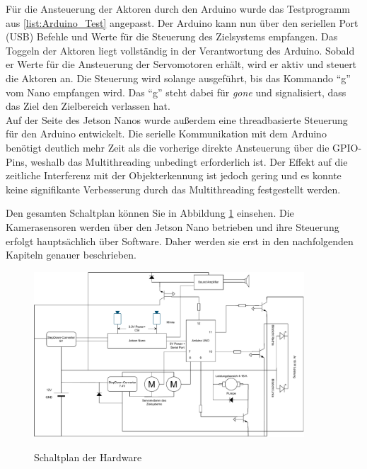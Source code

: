 Für die Ansteuerung der Aktoren durch den Arduino wurde das Testprogramm aus \ref{list:Arduino_Test} angepasst. Der Arduino kann nun über den seriellen Port (USB) Befehle und Werte für die Steuerung des Zielsystems empfangen. Das Toggeln der Aktoren liegt vollständig in der Verantwortung des Arduino. Sobald er Werte für die Ansteuerung der Servomotoren erhält, wird er aktiv und steuert die Aktoren an. Die Steuerung wird solange ausgeführt, bis das Kommando "`g"' vom Nano empfangen wird. Das "`g"' steht dabei für \textit{gone} und signalisiert, dass das Ziel den Zielbereich verlassen hat.
\\
Auf der Seite des Jetson Nanos wurde außerdem eine threadbasierte Steuerung für den Arduino entwickelt. Die serielle Kommunikation mit dem Arduino benötigt deutlich mehr Zeit als die vorherige direkte Ansteuerung über die \ac{GPIO}-Pins, weshalb das Multithreading unbedingt erforderlich ist. Der Effekt auf die zeitliche Interferenz mit der Objekterkennung ist jedoch gering und es konnte keine signifikante Verbesserung durch das Multithreading festgestellt werden.

Den gesamten Schaltplan können Sie in Abbildung \ref{diag:all} einsehen. Die Kamerasensoren werden über den Jetson Nano betrieben und ihre Steuerung erfolgt hauptsächlich über Software. Daher werden sie erst in den nachfolgenden Kapiteln genauer beschrieben.

\begin{figure}[H]
    \centering
    \includegraphics[angle=90,width=0.9\textwidth]{images/Schaltskizzen-Seite-3.drawio.pdf}
    \label{diag:all}
    \caption{Schaltplan der Hardware}
\end{figure}
